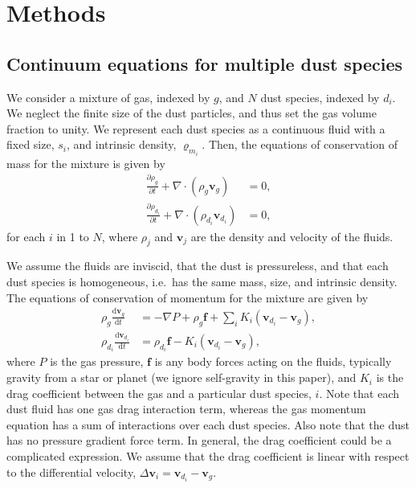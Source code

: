 \documentclass[fleqn,usenatbib]{mnras}
\newcommand{\dd}{\mathrm{d}}
\let\vec\mathbf
\begin{document}
\section{Methods}

\subsection{Continuum equations for multiple dust species}

We consider a mixture of gas, indexed by \(g\), and \(N\) dust species, indexed
by \(d_i\). We neglect the finite size of the dust particles, and thus set the
gas volume fraction to unity. We represent each dust species as a continuous
fluid with a fixed size, \(s_i\), and intrinsic density, \(\varrho_{m_i}\).
Then, the equations of conservation of mass for the mixture is given by
%
\begin{align}
   \label{eqn:conserve-gas-mass}
   \frac{\partial \rho_g}{\partial t} + \nabla \cdot (\rho_g \vec{v}_g) &= 0, \\
   \label{eqn:conserve-dust-mass}
   \frac{\partial \rho_{d_i}}{\partial t} + \nabla \cdot (\rho_{d_i} \vec{v}_{d_i}) &= 0,
\end{align}
%
for each \(i\) in 1 to \(N\), where \(\rho_j\) and \(\vec{v}_j\) are the density
and velocity of the fluids.

We assume the fluids are inviscid, that the dust is pressureless, and that each
dust species is homogeneous, i.e.\ has the same mass, size, and intrinsic
density. The equations of conservation of momentum for the mixture are given by
%
\begin{align}
   \rho_g \frac{\dd \vec{v}_g}{\dd t}
      &= - \nabla P + \rho_g \vec{f} + \sum_i K_i \left(\vec{v}_{d_i}
         - \vec{v}_{g}\right), \\
   \rho_{d_i} \frac{\dd \vec{v}_{d_i}}{\dd t}
      &= \rho_{d_i} \vec{f} - K_i \left(\vec{v}_{d_i} - \vec{v}_{g}\right),
\end{align}
%
where \(P\) is the gas pressure, \(\vec{f}\) is any body forces acting on the
fluids, typically gravity from a star or planet (we ignore self-gravity in this
paper), and \(K_i\) is the drag coefficient between the gas and a particular
dust species, \(i\). Note that each dust fluid has one gas drag interaction
term, whereas the gas momentum equation has a sum of interactions over each dust
species. Also note that the dust has no pressure gradient force term. In
general, the drag coefficient could be a complicated expression. We assume that
the drag coefficient is linear with respect to the differential velocity,
\(\Delta \vec{v}_i = \vec{v}_{d_i} - \vec{v}_g \).
\end{document}
